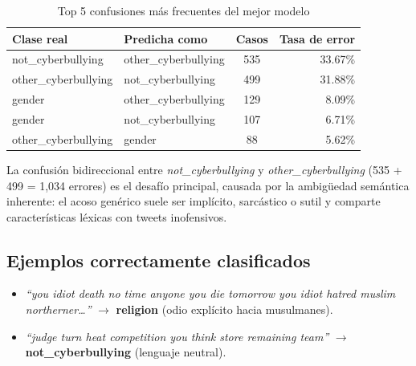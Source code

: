 ﻿\documentclass[12pt,a4paper]{article}
\begin{document}
\begin{table}[H]
\centering
\caption{Top 5 confusiones más frecuentes del mejor modelo}
\label{tab:confusions}
\begin{tabular}{llcr}
\toprule
Clase real & Predicha como & Casos & Tasa de error \\
\midrule
not\_cyberbullying   & other\_cyberbullying & 535 & 33.67\% \\
other\_cyberbullying & not\_cyberbullying   & 499 & 31.88\% \\
gender               & other\_cyberbullying & 129 &  8.09\% \\
gender               & not\_cyberbullying   & 107 &  6.71\% \\
other\_cyberbullying & gender               &  88 &  5.62\% \\
\bottomrule
\end{tabular}
\end{table}

La confusión bidireccional entre \textit{not\_cyberbullying} y
\textit{other\_cyberbullying} (535 + 499 = 1,034 errores) es el desafío
principal, causada por la ambigüedad semántica inherente: el acoso genérico
suele ser implícito, sarcástico o sutil y comparte características léxicas
con tweets inofensivos.

\subsection{Ejemplos correctamente clasificados}
\begin{itemize}
  \item \textit{``you idiot death no time anyone you die tomorrow you idiot
        hatred muslim northerner\ldots''}
        $\to$ \textbf{religion} (odio explícito hacia musulmanes).
  \item \textit{``judge turn heat competition you think store remaining
        team''} $\to$ \textbf{not\_cyberbullying} (lenguaje neutral).
\end{itemize}
\end{document}
